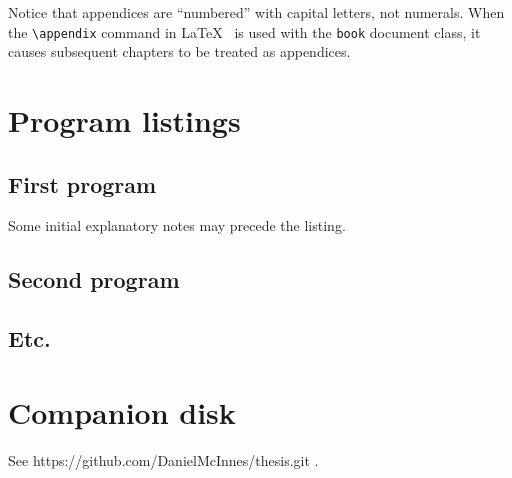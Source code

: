 \documentclass[12pt,openany,a4paper]{book}
\begin{document}
Notice that appendices are ``numbered'' with capital letters, not
numerals.  When the \verb+\appendix+ command in
\LaTeX~\cite[p.\,175]{lamport} is used with the \texttt{book} document
class, it causes subsequent chapters to be treated as appendices.

\chapter{Program listings}

\section{First program}

Some initial explanatory notes may precede the listing.

\section{Second program}

\section{Etc.}

\chapter{Companion disk}

See https://github.com/DanielMcInnes/thesis.git .

\cleardoublepage
\end{document}
